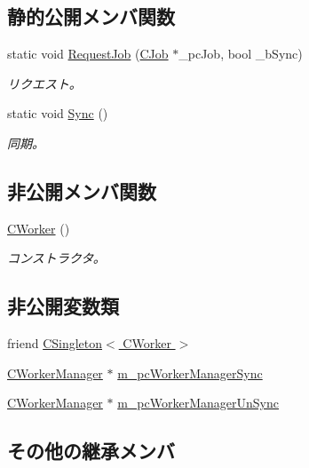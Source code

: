 \subsection*{静的公開メンバ関数}
\begin{DoxyCompactItemize}
\item 
static void \hyperlink{class_c_worker_ad8d0e6b957ab9d84b6fe6290b564f23d}{Request\+Job} (\hyperlink{class_c_job}{C\+Job} $\ast$\+\_\+pc\+Job, bool \+\_\+b\+Sync)
\begin{DoxyCompactList}\small\item\em リクエスト。 \end{DoxyCompactList}\item 
static void \hyperlink{class_c_worker_a0cf70f37ffdadae5afb4606bd989ba6b}{Sync} ()
\begin{DoxyCompactList}\small\item\em 同期。 \end{DoxyCompactList}\end{DoxyCompactItemize}
\subsection*{非公開メンバ関数}
\begin{DoxyCompactItemize}
\item 
\hyperlink{class_c_worker_ab70f18344c40b5492db3836891d53990}{C\+Worker} ()
\begin{DoxyCompactList}\small\item\em コンストラクタ。 \end{DoxyCompactList}\end{DoxyCompactItemize}
\subsection*{非公開変数類}
\begin{DoxyCompactItemize}
\item 
friend \hyperlink{class_c_worker_aecbc638ed646f882a08fe4b6d6c4653c}{C\+Singleton$<$ C\+Worker $>$}
\item 
\hyperlink{class_c_worker_manager}{C\+Worker\+Manager} $\ast$ \hyperlink{class_c_worker_ae982e4473bdc5cee56f351c9888007f5}{m\+\_\+pc\+Worker\+Manager\+Sync}
\item 
\hyperlink{class_c_worker_manager}{C\+Worker\+Manager} $\ast$ \hyperlink{class_c_worker_ab96d974805f466c392897f55cd13e000}{m\+\_\+pc\+Worker\+Manager\+Un\+Sync}
\end{DoxyCompactItemize}
\subsection*{その他の継承メンバ}



